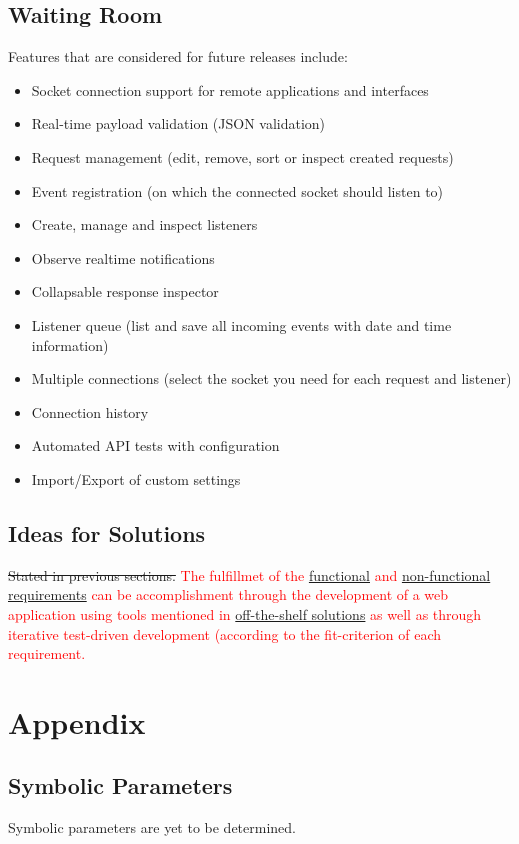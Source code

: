 \documentclass[12pt, titlepage]{article}
\begin{document}
\subsection{Waiting Room}
Features that are considered for future releases include:
\begin{itemize}
	\item Socket connection support for remote applications and interfaces 
	\item Real-time payload validation (JSON validation)
	\item Request management (edit, remove, sort or inspect created requests)
	\item Event registration (on which the connected socket should listen to)
	\item Create, manage and inspect listeners
	\item Observe realtime notifications
	\item Collapsable response inspector
	\item Listener queue (list and save all incoming events with date and time information)
	\item Multiple connections (select the socket you need for each request and listener)
	\item Connection history
	\item Automated API tests with configuration
	\item Import/Export of custom settings
\end{itemize}
\subsection{Ideas for Solutions}
\sout{Stated in previous sections.} \textcolor{red}{The fulfillmet of the \hyperref[fr]{functional} and \hyperref[nfr]{non-functional requirements} can be accomplishment through the development of a web application using tools mentioned in \hyperref[otss]{off-the-shelf solutions} as well as through iterative test-driven development (according to the fit-criterion of each requirement.}





\newpage

\section{Appendix}

\subsection{Symbolic Parameters}

Symbolic parameters are yet to be determined.
\end{document}
